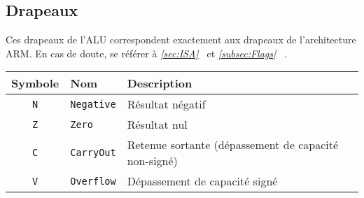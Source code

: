 \subsection{Drapeaux}

Ces drapeaux de l'ALU correspondent exactement aux drapeaux de l'architecture ARM. En cas de doute, se référer à \textit{\ref{sec:ISA}~} et \textit{\ref{subsec:Flags}~} .

\begin{tabular}{|c|l|l|}
\hline
\textbf{Symbole} & \textbf{Nom} & \textbf{Description}\\
\hline

\texttt{N}	& \texttt{Negative}	& Résultat négatif\\
\hline
\texttt{Z}	& \texttt{Zero}		& Résultat nul\\
\hline
\texttt{C}	& \texttt{CarryOut}	& Retenue sortante (dépassement de capacité non-signé)\\
\hline
\texttt{V}	&  \texttt{Overflow}	& Dépassement de capacité signé\\

\hline
\end{tabular}
